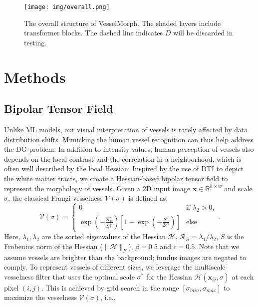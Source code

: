 \documentclass[runningheads]{llncs}
\DeclareMathOperator*{\argmax}{argmax} %
\begin{document}
\begin{figure}[t]
    \centering
    \texttt{[image: img/overall.png]}
    \caption{The overall structure of VesselMorph. The shaded layers include transformer blocks. The dashed line indicates $D$ will be discarded in testing.}
    \label{fig:pipeline}
\end{figure}

\section{Methods}

\subsection{Bipolar Tensor Field} \label{Sec:BTF}
Unlike ML models, our visual interpretation of vessels is rarely affected by data distribution shifts. Mimicking the human vessel recognition can thus help address the DG problem. In addition to intensity values, human perception of vessels also depends on the local contrast and the correlation in a neighborhood, which is often well described by the local Hessian. Inspired by the use of DTI to depict the white matter tracts, we create a Hessian-based bipolar tensor field to represent the morphology of vessels. Given a 2D input image $\mathbf{x}\in\mathbb{R}^{h\times w}$ and scale $\sigma$, the classical Frangi vesselness $\mathcal{V}(\sigma)$ \cite{frangi1998multiscale} is defined as:
\begin{equation}
\mathcal{V(\sigma)} = \begin{cases}
                      0 & \text{if }\lambda_2>0,\\
                      \exp\left(-\frac{\mathcal{R}_B^2}{2\beta^2}\right)\left[1-\exp\left(-\frac{S^2}{2c^2}\right)\right] & \text{else}
\end{cases}.
\end{equation}
Here, $\lambda_1, \lambda_2$ are the sorted eigenvalues of the Hessian $\mathcal{H}$,  $\mathcal{R}_B=\lambda_1/\lambda_2$, $S$ is the Frobenius norm of the Hessian ($\|\mathcal{H}\|_F$), $\beta=0.5$ and $c=0.5$. Note that we assume vessels are brighter than the background; fundus images are negated to comply. To represent vessels of different sizes, we leverage the multiscale vesselness filter that uses the optimal scale $\sigma^*$ for the Hessian  $\mathcal{H}(\mathbf{x}_{ij},\sigma)$ at each pixel $(i,j)$. This is achieved by grid search in the range $[\sigma_{min},\sigma_{max}]$ to maximize the vesselness $\mathcal{V}(\sigma)$, i.e., 
\end{document}
